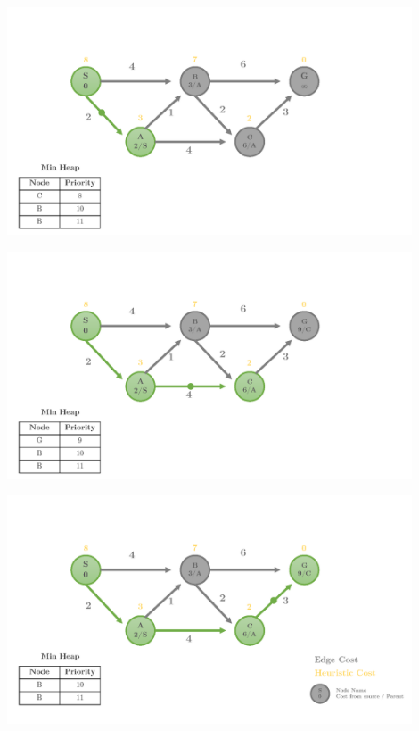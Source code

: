 \documentclass[12pt]{article}
\begin{document}
\begin{center}
  \includegraphics[width=0.9\textwidth]{heuristic1_Page3.png}
\end{center}

\begin{center}
  \includegraphics[width=0.9\textwidth]{heuristic1_Page4.png}
\end{center}

\begin{center}
  \includegraphics[width=0.9\textwidth]{heuristic1_Page5.png}
\end{center}
\end{document}
